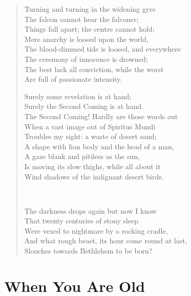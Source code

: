 \documentclass[10pt,a5paper,oneside]{book}
\begin{document}
\begin{verse}
Turning and turning in the widening gyre\\
The falcon cannot hear the falconer;\\
Things fall apart; the centre cannot hold;\\
Mere anarchy is loosed upon the world,\\
The blood-dimmed tide is loosed, and everywhere\\
The ceremony of innocence is drowned;\\
The best lack all conviction, while the worst\\
Are full of passionate intensity.

Surely some revelation is at hand;\\
Surely the Second Coming is at hand.\\
The Second Coming! Hardly are those words out\\
When a vast image out of Spiritus Mundi\\
Troubles my sight: a waste of desert sand;\\
A shape with lion body and the head of a man,\\
A gaze blank and pitiless as the sun,\\
Is moving its slow thighs, while all about it\\
Wind shadows of the indignant desert birds.

~~

The darkness drops again but now I know\\
That twenty centuries of stony sleep\\
Were vexed to nightmare by a rocking cradle,\\
And what rough beast, its hour come round at last,\\
Slouches towards Bethlehem to be born?
\end{verse}

\chapter{When You Are Old}
\end{document}
